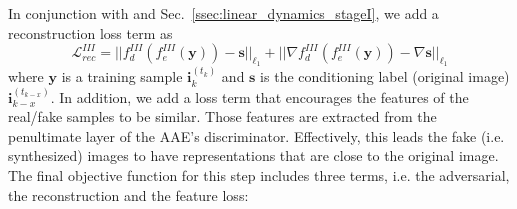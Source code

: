 \documentclass[10pt,twocolumn,letterpaper]{article}
\begin{document}
In conjunction with \cite{isola2016image} and Sec.~\ref{ssec:linear_dynamics_stageI}, we add a reconstruction loss term as 
\begin{equation}
    \mathcal{L}_{rec}^{III} = ||f_d^{III}(f_e^{III}(\bm{y})) - \bm{s}||_{\ell_1} + ||\nabla f_d^{III}(f_e^{III}(\bm{y})) - \nabla \bm{s}||_{\ell_1}
    \label{eq:linear_dynamics_stageIII_recloss}
\end{equation}
where $\bm{y}$ is a training sample $\bm{i}_k^{(t_k)}$ and $\bm{s}$ is the conditioning label (original image) $\bm{i}_{k - x}^{(t_{k - x})}$.
In addition, we add a loss term that encourages the features of the real/fake samples to be similar. Those features are extracted from the penultimate layer of the AAE's discriminator. Effectively, this leads the fake (i.e. synthesized) images to have representations that are close to the original image. 
The final objective function for this step includes three terms, i.e. the adversarial, the reconstruction and the feature loss:
\end{document}
